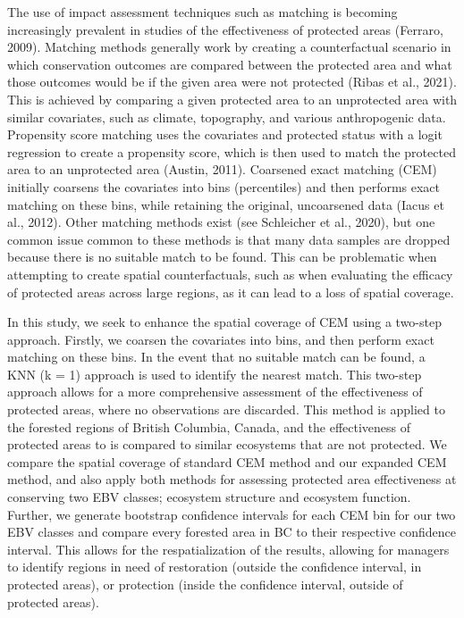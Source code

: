 \documentclass[
]{agujournal2019}
\begin{document}
The use of impact assessment techniques such as matching is becoming
increasingly prevalent in studies of the effectiveness of protected
areas (Ferraro, 2009). Matching methods generally work by creating a
counterfactual scenario in which conservation outcomes are compared
between the protected area and what those outcomes would be if the given
area were not protected (Ribas et al., 2021). This is achieved by
comparing a given protected area to an unprotected area with similar
covariates, such as climate, topography, and various anthropogenic data.
Propensity score matching uses the covariates and protected status with
a logit regression to create a propensity score, which is then used to
match the protected area to an unprotected area (Austin, 2011).
Coarsened exact matching (CEM) initially coarsens the covariates into
bins (percentiles) and then performs exact matching on these bins, while
retaining the original, uncoarsened data (Iacus et al., 2012). Other
matching methods exist (see Schleicher et al., 2020), but one common
issue common to these methods is that many data samples are dropped
because there is no suitable match to be found. This can be problematic
when attempting to create spatial counterfactuals, such as when
evaluating the efficacy of protected areas across large regions, as it
can lead to a loss of spatial coverage.

In this study, we seek to enhance the spatial coverage of CEM using a
two-step approach. Firstly, we coarsen the covariates into bins, and
then perform exact matching on these bins. In the event that no suitable
match can be found, a KNN (k = 1) approach is used to identify the
nearest match. This two-step approach allows for a more comprehensive
assessment of the effectiveness of protected areas, where no
observations are discarded. This method is applied to the forested
regions of British Columbia, Canada, and the effectiveness of protected
areas to is compared to similar ecosystems that are not protected. We
compare the spatial coverage of standard CEM method and our expanded CEM
method, and also apply both methods for assessing protected area
effectiveness at conserving two EBV classes; ecosystem structure and
ecosystem function. Further, we generate bootstrap confidence intervals
for each CEM bin for our two EBV classes and compare every forested area
in BC to their respective confidence interval. This allows for the
respatialization of the results, allowing for managers to identify
regions in need of restoration (outside the confidence interval, in
protected areas), or protection (inside the confidence interval, outside
of protected areas).
\end{document}

